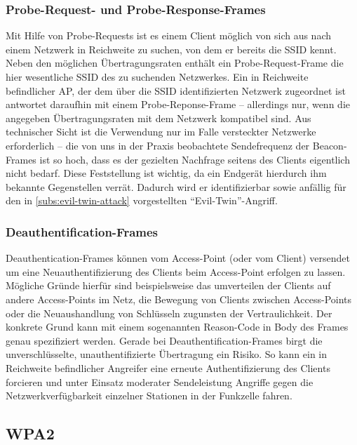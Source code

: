 \subsubsection{Probe-Request- und Probe-Response-Frames}
Mit Hilfe von Probe-Requests ist es einem Client möglich von sich aus nach einem Netzwerk in Reichweite zu suchen, von dem er bereits die SSID kennt. Neben den möglichen Übertragungsraten enthält ein Probe-Request-Frame die hier wesentliche SSID des zu suchenden Netzwerkes. Ein in Reichweite befindlicher AP, der dem über die SSID identifizierten Netzwerk zugeordnet ist antwortet daraufhin mit einem Probe-Reponse-Frame -- allerdings nur, wenn die angegeben Übertragungsraten mit dem Netzwerk kompatibel sind. Aus technischer Sicht ist die Verwendung nur im Falle versteckter Netzwerke erforderlich -- die von uns in der Praxis beobachtete Sendefrequenz der Beacon-Frames ist so hoch, dass es der gezielten Nachfrage seitens des Clients eigentlich nicht bedarf. Diese Feststellung ist wichtig, da ein Endgerät hierdurch ihm bekannte Gegenstellen verrät. Dadurch wird er identifizierbar sowie anfällig für den in \ref{subs:evil-twin-attack} vorgestellten \enquote{Evil-Twin}-Angriff.

\subsubsection{Deauthentification-Frames}\label{subs:deauthentication-frames}

Deauthentication-Frames können vom Access-Point (oder vom Client) versendet um eine Neuauthentifizierung des Clients beim Access-Point erfolgen zu lassen.
Mögliche Gründe hierfür sind beispielsweise das umverteilen der Clients auf andere Access-Points im Netz, die Bewegung von Clients zwischen Access-Points oder die Neuaushandlung von Schlüsseln zugunsten der Vertraulichkeit.
Der konkrete Grund kann mit einem sogenannten Reason-Code in Body des Frames genau spezifiziert werden.
Gerade bei Deauthentification-Frames birgt die unverschlüsselte, unauthentifizierte Übertragung ein Risiko.
So kann ein in Reichweite befindlicher Angreifer eine erneute Authentifizierung des Clients forcieren und unter Einsatz moderater Sendeleistung Angriffe gegen die Netzwerkverfügbarkeit einzelner Stationen in der Funkzelle fahren.

\subsection{WPA2}